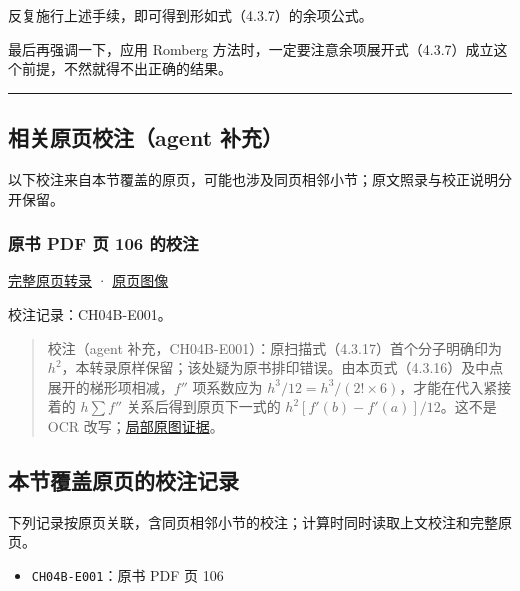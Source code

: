 \documentclass[
  10pt,
  fontset=fandol]{ctexart}
\providecommand{\tightlist}{%
  \setlength{\itemsep}{0pt}\setlength{\parskip}{0pt}}
\begin{document}
反复施行上述手续，即可得到形如式（4.3.7）的余项公式。

最后再强调一下，应用 Romberg 方法时，一定要注意余项展开式（4.3.7）成立这个前提，不然就得不出正确的结果。

\begin{center}\rule{0.5\linewidth}{0.5pt}\end{center}

\subsection{相关原页校注（agent 补充）}\label{ux76f8ux5173ux539fux9875ux6821ux6ce8agent-ux8865ux5145}

以下校注来自本节覆盖的原页，可能也涉及同页相邻小节；原文照录与校正说明分开保留。

\subsubsection{原书 PDF 页 106 的校注}\label{ux539fux4e66-pdf-ux9875-106-ux7684ux6821ux6ce8}

\href{../pages/pdf-106.md}{完整原页转录} · \href{../../source-images/pdf-106.jpeg}{原页图像}

校注记录：CH04B-E001。

\begin{quote}
校注（agent 补充，CH04B-E001）：原扫描式（4.3.17）首个分子明确印为 \(h^2\)，本转录原样保留；该处疑为原书排印错误。由本页式（4.3.16）及中点展开的梯形项相减，\(f''\) 项系数应为 \(h^3/12=h^3/(2!\times6)\)，才能在代入紧接着的 \(h\sum f''\) 关系后得到原页下一式的 \(h^2[f'(b)-f'(a)]/12\)。这不是 OCR 改写；\href{../assets/ch04b/review-p106-middle.png}{局部原图证据}。
\end{quote}

\subsection{本节覆盖原页的校注记录}\label{ux672cux8282ux8986ux76d6ux539fux9875ux7684ux6821ux6ce8ux8bb0ux5f55}

下列记录按原页关联，含同页相邻小节的校注；计算时同时读取上文校注和完整原页。

\begin{itemize}
\tightlist
\item
  \texttt{CH04B-E001}：原书 PDF 页 106
\end{itemize}
\end{document}
